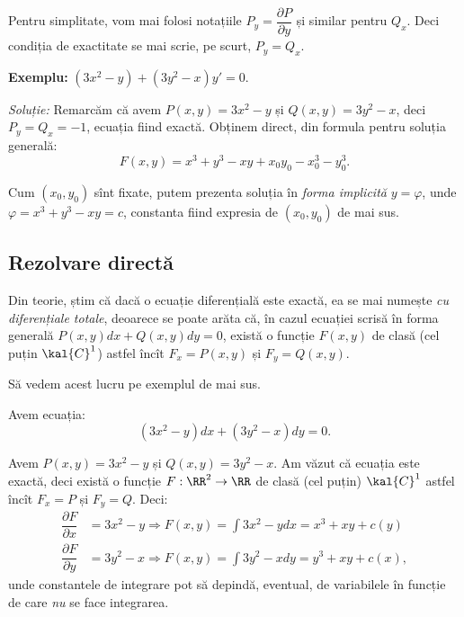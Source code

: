 \begin{remark}\label{rk:partial}
  Pentru simplitate, vom mai folosi notațiile $P_y = \dfrac{\partial P}{\partial y}$ și
  similar pentru $Q_x$. Deci condiția de exactitate se mai scrie, pe scurt, $P_y = Q_x$.
\end{remark}

\vspace{1cm}

\textbf{Exemplu:} $(3x^2 - y) + (3y^2 - x) y' = 0$.

\emph{Soluție:} Remarcăm că avem $P(x, y) = 3x^2 - y$ și $Q(x, y) = 3y^2 - x$, deci
$P_y = Q_x = -1$, ecuația fiind exactă. Obținem direct, din formula pentru soluția generală:
\[
  F(x, y) = x^3 + y^3 - xy + x_0y_0 - x_0^3 - y_0^3.
\]

Cum $(x_0, y_0)$ sînt fixate, putem prezenta soluția în \emph{forma implicită} $y = \varphi$,
unde $\varphi = x^3 + y^3 - xy = c$, constanta fiind expresia de $(x_0, y_0)$ de mai sus.


\subsection{Rezolvare directă}

Din teorie, știm că dacă o ecuație diferențială este exactă, ea se mai numește
\emph{cu diferențiale totale}, deoarece se poate arăta că, în cazul ecuației
scrisă în forma generală $ P(x, y) dx + Q(x, y) dy = 0 $, există o funcție
$ F(x, y) $ de clasă (cel puțin $\kal{C}^1$) astfel încît $ F_x = P(x, y) $ și
$ F_y = Q(x, y) $.

Să vedem acest lucru pe exemplul de mai sus.

Avem ecuația:
\[
  (3x^2 - y)dx + (3y^2 - x) dy = 0.
\]

Avem $P(x,y) = 3x^2 - y $ și $ Q(x,y) = 3y^2 - x$. Am văzut că ecuația este
exactă, deci există o funcție $ F : \RR^2 \to \RR $ de clasă (cel puțin)
$ \kal{C}^1 $ astfel încît $ F_x = P $ și $ F_y = Q $. Deci:
\begin{align*}
  \dfrac{\partial F}{\partial x} &= 3x^2 - y \Rightarrow F(x, y) = \int 3x^2 - y dx = %
                                   x^3 + xy + c(y) \\
  \dfrac{\partial F}{\partial y} &= 3y^2 - x \Rightarrow F(x, y) = \int 3y^2 - x dy = %
                                   y^3 + xy + c(x),
\end{align*}
unde constantele de integrare pot să depindă, eventual, de variabilele în funcție
de care \emph{nu} se face integrarea.

